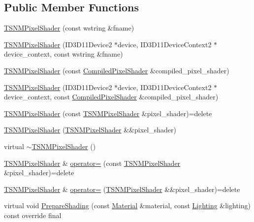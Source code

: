 \subsection*{Public Member Functions}
\begin{DoxyCompactItemize}
\item 
\hyperlink{classmage_1_1_t_s_n_m_pixel_shader_a0081c5ca9470521f2f7d01dfcfe1996d}{T\+S\+N\+M\+Pixel\+Shader} (const wstring \&fname)
\item 
\hyperlink{classmage_1_1_t_s_n_m_pixel_shader_af5ff9bfc033ea0fc1cf4c747cbe2c3c9}{T\+S\+N\+M\+Pixel\+Shader} (I\+D3\+D11\+Device2 $\ast$device, I\+D3\+D11\+Device\+Context2 $\ast$device\+\_\+context, const wstring \&fname)
\item 
\hyperlink{classmage_1_1_t_s_n_m_pixel_shader_a2e2d9c729d40ebc12feff7de7437b0e2}{T\+S\+N\+M\+Pixel\+Shader} (const \hyperlink{structmage_1_1_compiled_pixel_shader}{Compiled\+Pixel\+Shader} \&compiled\+\_\+pixel\+\_\+shader)
\item 
\hyperlink{classmage_1_1_t_s_n_m_pixel_shader_aa04056a841bae6945546772dd298c5f4}{T\+S\+N\+M\+Pixel\+Shader} (I\+D3\+D11\+Device2 $\ast$device, I\+D3\+D11\+Device\+Context2 $\ast$device\+\_\+context, const \hyperlink{structmage_1_1_compiled_pixel_shader}{Compiled\+Pixel\+Shader} \&compiled\+\_\+pixel\+\_\+shader)
\item 
\hyperlink{classmage_1_1_t_s_n_m_pixel_shader_af01a39116e8759ecd28aaba009c8b8ad}{T\+S\+N\+M\+Pixel\+Shader} (const \hyperlink{classmage_1_1_t_s_n_m_pixel_shader}{T\+S\+N\+M\+Pixel\+Shader} \&pixel\+\_\+shader)=delete
\item 
\hyperlink{classmage_1_1_t_s_n_m_pixel_shader_a4889850bd4ff6c3a3d22c9637752ce37}{T\+S\+N\+M\+Pixel\+Shader} (\hyperlink{classmage_1_1_t_s_n_m_pixel_shader}{T\+S\+N\+M\+Pixel\+Shader} \&\&pixel\+\_\+shader)
\item 
virtual \hyperlink{classmage_1_1_t_s_n_m_pixel_shader_ae7c20ffb872faffb28714b39916e4250}{$\sim$\+T\+S\+N\+M\+Pixel\+Shader} ()
\item 
\hyperlink{classmage_1_1_t_s_n_m_pixel_shader}{T\+S\+N\+M\+Pixel\+Shader} \& \hyperlink{classmage_1_1_t_s_n_m_pixel_shader_a8c9bc92d544b088e9530f8f47df2b4a6}{operator=} (const \hyperlink{classmage_1_1_t_s_n_m_pixel_shader}{T\+S\+N\+M\+Pixel\+Shader} \&pixel\+\_\+shader)=delete
\item 
\hyperlink{classmage_1_1_t_s_n_m_pixel_shader}{T\+S\+N\+M\+Pixel\+Shader} \& \hyperlink{classmage_1_1_t_s_n_m_pixel_shader_a0d714c73017f9bb9b273b2d2a276ab5f}{operator=} (\hyperlink{classmage_1_1_t_s_n_m_pixel_shader}{T\+S\+N\+M\+Pixel\+Shader} \&\&pixel\+\_\+shader)=delete
\item 
virtual void \hyperlink{classmage_1_1_t_s_n_m_pixel_shader_abe01a4e6007a0a1ca98ed8fe48523138}{Prepare\+Shading} (const \hyperlink{structmage_1_1_material}{Material} \&material, const \hyperlink{structmage_1_1_lighting}{Lighting} \&lighting) const override final
\end{DoxyCompactItemize}
